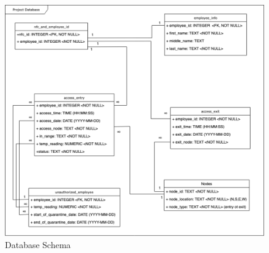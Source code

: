 \begin{figure}[!htb]
\includegraphics[width=\textwidth]{images/db-schema.png}
\caption{Database Schema}
\end{figure}

